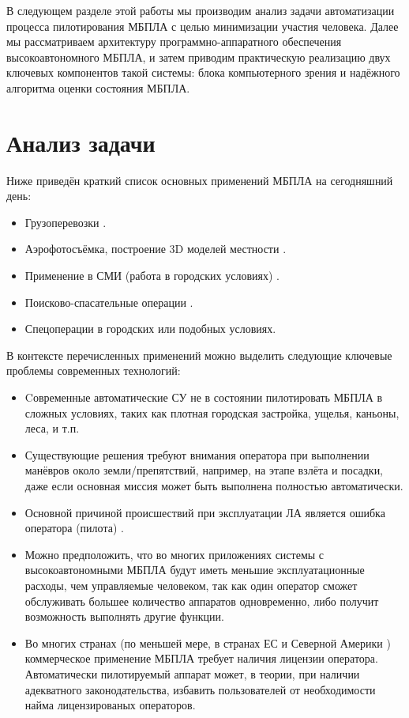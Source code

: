 \documentclass[12pt,a4paper]{article}
\begin{document}
В следующем разделе этой работы мы производим анализ задачи автоматизации процесса пилотирования МБПЛА с целью минимизации участия человека. Далее мы рассматриваем архитектуру программно-аппаратного обеспечения высокоавтономного МБПЛА, и затем приводим практическую реализацию двух ключевых компонентов такой системы: блока компьютерного зрения и надёжного алгоритма оценки состояния МБПЛА.

\section{Анализ задачи}

Ниже приведён краткий список основных применений МБПЛА на сегодняшний день:

\begin{itemize}
    \item Грузоперевозки \cite{AmazonPrimeAir, DHLParcelcopter}.
    \item Аэрофотосъёмка, построение 3D моделей местности \cite{DroneMapper, MicrodronesAerialImagery}.
    \item Применение в СМИ (работа в городских условиях) \cite{DroneJournalism}.
    \item Поисково-спасательные операции \cite{SARDrones}.
    \item Спецоперации в городских или подобных условиях.
\end{itemize}

В контексте перечисленных применений можно выделить следующие ключевые проблемы современных технологий:

\begin{itemize}
    \item Cовременные автоматические СУ не в состоянии пилотировать МБПЛА в сложных условиях, таких как плотная городская застройка, ущелья, каньоны, леса, и т.п.
    \item Существующие решения требуют внимания оператора при выполнении манёвров около земли/препятствий, например, на этапе взлёта и посадки, даже если основная миссия может быть выполнена полностью автоматически.
    \item Основной причиной происшествий при эксплуатации ЛА является ошибка оператора (пилота) \cite{RiskManagementHandbookFAA, PlaneCrashInfo, HumanFactorsBoeing}.
    \item Можно предположить, что во многих приложениях системы с высокоавтономными МБПЛА будут иметь меньшие эксплуатационные расходы, чем управляемые человеком, так как один оператор сможет обслуживать большее количество аппаратов одновременно, либо получит возможность выполнять другие функции.
    \item Во многих странах (по меньшей мере, в странах ЕС \cite{EURPASFAQ} и Северной Америки \cite{FAAUAS}) коммерческое применение МБПЛА требует наличия лицензии оператора. Автоматически пилотируемый аппарат может, в теории, при наличии адекватного законодательства, избавить пользователей от необходимости найма лицензированых операторов.
\end{itemize}
\end{document}

